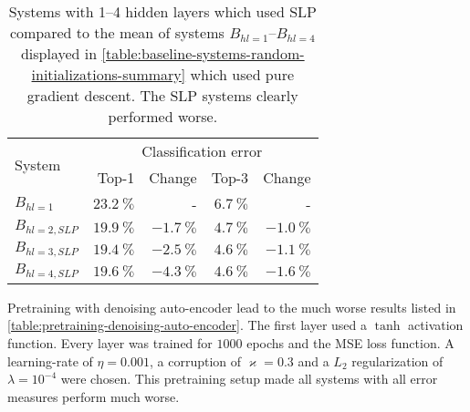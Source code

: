 \begin{table}[tb]
    \centering
    \begin{tabular}{lrrrr}
    \toprule
    \multirow{2}{*}{System}  & \multicolumn{4}{c}{Classification error}\\
    \cmidrule(l){2-5}
                & Top-1                  & Change               & Top-3                & Change                 \\\midrule
    $B_{hl=1}$     & $\SI{23.2}{\percent}$  & -                    & $\SI{6.7}{\percent}$ & - \\
    $B_{hl=2,SLP}$ & $\SI{19.9}{\percent}$ & $\SI{-1.7}{\percent}$ & $\SI{4.7}{\percent}$ & $\SI{-1.0}{\percent}$\\
    $B_{hl=3,SLP}$ & \underline{$\SI{19.4}{\percent}$} & $\SI{-2.5}{\percent}$ & \underline{$\SI{4.6}{\percent}$} & $\SI{-1.1}{\percent}$\\
    $B_{hl=4,SLP}$ & $\SI{19.6}{\percent}$ & $\SI{-4.3}{\percent}$ & \underline{$\SI{4.6}{\percent}$} & $\SI{-1.6}{\percent}$\\
    \bottomrule
    \end{tabular}
    \caption{Systems with 1--4 hidden layers which used \acrfull{SLP}
             compared to the mean of systems $B_{hl=1}$--$B_{hl=4}$ displayed
             in \cref{table:baseline-systems-random-initializations-summary}
             which used pure gradient descent. The \gls{SLP}
             systems clearly performed worse.}
\label{table:pretraining-slp}
\end{table}


Pretraining with denoising auto-encoder lead to the much worse results listed in
\cref{table:pretraining-denoising-auto-encoder}. The first layer used a $\tanh$
activation function. Every layer was trained for $1000$ epochs and the
\gls{MSE} loss function. A learning-rate of $\eta = 0.001$, a corruption of
$\varkappa = 0.3$ and a $L_2$ regularization of $\lambda = 10^{-4}$ were
chosen. This pretraining setup made all systems with all error measures perform
much worse.


